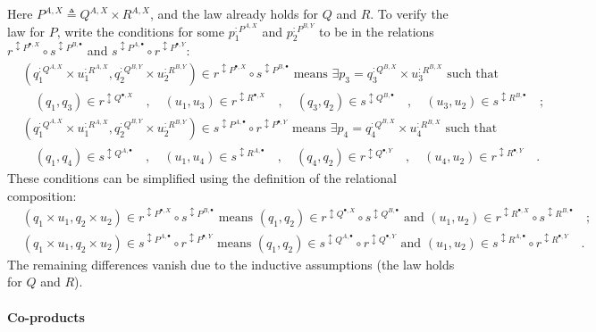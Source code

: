Here $P^{A,X}\triangleq Q^{A,X}\times R^{A,X}$, and the law already
holds for $Q$ and $R$. To verify the law for $P$, write the conditions
for some $p_{1}^{:P^{A,X}}$ and $p_{2}^{:P^{B,Y}}$ to be in the
relations $r^{\updownarrow P^{\bullet,X}}\circ s^{\updownarrow P^{B,\bullet}}$
and $s^{\updownarrow P^{A,\bullet}}\circ r^{\updownarrow P^{\bullet,Y}}$:
\begin{align*}
 & (q_{1}^{:Q^{A,X}}\times u_{1}^{:R^{A,X}},q_{2}^{:Q^{B,Y}}\times u_{2}^{:R^{B,Y}})\in r^{\updownarrow P^{\bullet,X}}\circ s^{\updownarrow P^{B,\bullet}}\text{ means }\exists p_{3}=q_{3}^{:Q^{B,X}}\times u_{3}^{:R^{B,X}}\text{ such that }\\
 & \quad(q_{1},q_{3})\in r^{\updownarrow Q^{\bullet,X}}\quad,\quad(u_{1},u_{3})\in r^{\updownarrow R^{\bullet,X}}\quad,\quad(q_{3},q_{2})\in s^{\updownarrow Q^{B,\bullet}}\quad,\quad(u_{3},u_{2})\in s^{\updownarrow R^{B,\bullet}}\quad;\\
 & (q_{1}^{:Q^{A,X}}\times u_{1}^{:R^{A,X}},q_{2}^{:Q^{B,Y}}\times u_{2}^{:R^{B,Y}})\in s^{\updownarrow P^{A,\bullet}}\circ r^{\updownarrow P^{\bullet,Y}}\text{ means }\exists p_{4}=q_{4}^{:Q^{B,X}}\times u_{4}^{:R^{B,X}}\text{ such that }\\
 & \quad(q_{1},q_{4})\in s^{\updownarrow Q^{A,\bullet}}\quad,\quad(u_{1},u_{4})\in s^{\updownarrow R^{A,\bullet}}\quad,\quad(q_{4},q_{2})\in r^{\updownarrow Q^{\bullet,Y}}\quad,\quad(u_{4},u_{2})\in r^{\updownarrow R^{\bullet,Y}}\quad.
\end{align*}
These conditions can be simplified using the definition of the relational
composition: 
\begin{align*}
 & (q_{1}\times u_{1},q_{2}\times u_{2})\in r^{\updownarrow P^{\bullet,X}}\circ s^{\updownarrow P^{B,\bullet}}\text{ means }(q_{1},q_{2})\in r^{\updownarrow Q^{\bullet,X}}\circ s^{\updownarrow Q^{B,\bullet}}\text{ and }(u_{1},u_{2})\in r^{\updownarrow R^{\bullet,X}}\circ s^{\updownarrow R^{B,\bullet}}\quad;\\
 & (q_{1}\times u_{1},q_{2}\times u_{2})\in s^{\updownarrow P^{A,\bullet}}\circ r^{\updownarrow P^{\bullet,Y}}\text{ means }(q_{1},q_{2})\in s^{\updownarrow Q^{A,\bullet}}\circ r^{\updownarrow Q^{\bullet,Y}}\text{ and }(u_{1},u_{2})\in s^{\updownarrow R^{A,\bullet}}\circ r^{\updownarrow R^{\bullet,Y}}\quad.
\end{align*}
The remaining differences vanish due to the inductive assumptions
(the law holds for $Q$ and $R$).

\paragraph{Co-products}

